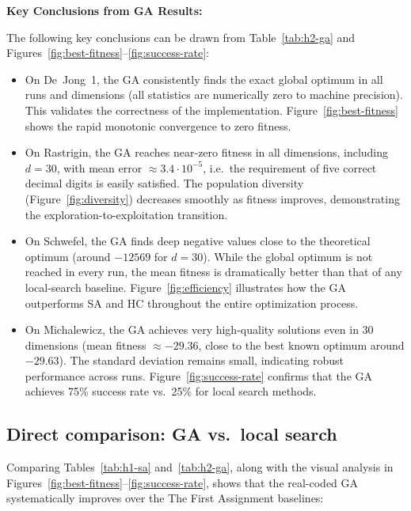 \documentclass[a4paper,11pt]{article}
\begin{document}
\noindent\textbf{Key Conclusions from GA Results:}

\vspace{0.5em}

The following key conclusions can be drawn from Table~\ref{tab:h2-ga} and Figures~\ref{fig:best-fitness}--\ref{fig:success-rate}:
\begin{itemize}
  \item On De~Jong~1, the GA consistently finds the exact global optimum in all
        runs and dimensions (all statistics are numerically zero to machine
        precision). This validates the correctness of the implementation.
        Figure~\ref{fig:best-fitness} shows the rapid monotonic convergence to zero fitness.
  \item On Rastrigin, the GA reaches near-zero fitness in all dimensions, including
        $d=30$, with mean error $\approx 3.4\cdot10^{-5}$, i.e.\ the requirement
        of five correct decimal digits is easily satisfied. The population diversity
        (Figure~\ref{fig:diversity}) decreases smoothly as fitness improves, demonstrating
        the exploration-to-exploitation transition.
  \item On Schwefel, the GA finds deep negative values close to the theoretical
        optimum (around $-12569$ for $d=30$). While the global optimum is not
        reached in every run, the mean fitness is dramatically better than that
        of any local-search baseline. Figure~\ref{fig:efficiency} illustrates how
        the GA outperforms SA and HC throughout the entire optimization process.
  \item On Michalewicz, the GA achieves very high-quality solutions even in
        30 dimensions (mean fitness $\approx -29.36$, close to the best known
        optimum around $-29.63$). The standard deviation remains small, indicating
        robust performance across runs. Figure~\ref{fig:success-rate} confirms
        that the GA achieves 75\% success rate vs.\ 25\% for local search methods.
\end{itemize}

\clearpage

\subsection{Direct comparison: GA vs.\ local search}

\vspace{1em}

Comparing Tables~\ref{tab:h1-sa} and~\ref{tab:h2-ga}, along with the visual analysis
in Figures~\ref{fig:best-fitness}--\ref{fig:success-rate}, shows that the real-coded
GA systematically improves over the The First Assignment baselines:
\end{document}

